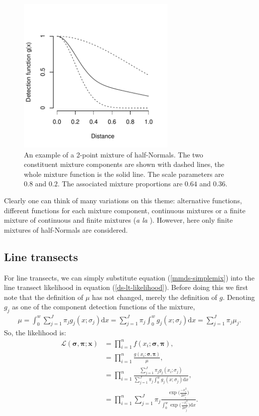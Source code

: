 \begin{figure}
\centering
\includegraphics[width=3in]{mix/figs/2ptdia.pdf}
\caption{An example of a 2-point mixture of half-Normals. The two constituent mixture components are shown with dashed lines, the whole mixture function is the solid line. The scale parameters are $0.8$ and $0.2$. The associated mixture proportions are $0.64$ and $0.36$.}
\label{2ptdia}
\end{figure}

Clearly one can think of many variations on this theme: alternative functions, different functions for each mixture component, continuous mixtures or a finite mixture of continuous and finite mixtures (\textit{a la} \cite{morgan08}). However, here only finite mixtures of half-Normals are considered.

\subsection{Line transects}
For line transects, we can simply substitute equation (\ref{mmds-simplemix}) into the line transect likelihood in equation (\ref{ds-lt-likelihood}). Before doing this we first note that the definition of $\mu$ has not changed, merely the definition of $g$. Denoting $g_j$ as one of the component detection functions of the mixture,
\begin{align*}
\mu = \int_0^w \sum_{j=1}^J \pi_j g_j(x;\sigma_j) \text{d}x = \sum_{j=1}^J \pi_j \int_0^w  g_j(x;\sigma_j) \text{d}x = \sum_{j=1}^J \pi_j \mu_j.
\end{align*}
So, the likelihood is:
\begin{align}
\mathcal{L}(\bm{\sigma}, \bm{\pi}; \bm{x}) &= \prod_{i=1}^n f(x_i;\bm{\sigma}, \bm{\pi}),\\
&= \prod_{i=1}^n \frac{g(x_i;\bm{\sigma}, \bm{\pi})}{\mu},\\
&= \prod_{i=1}^n \frac{\sum_{j=1}^J \pi_j g_j(x_i;\sigma_j)}{\sum_{j=1}^J \pi_j \int_0^w  g_j(x;\sigma_j) \text{d}x},\\
&= \prod_{i=1}^n \sum_{j=1}^J \pi_j \frac{\exp \Big( \frac{-x_i^2}{2 \sigma_j^2}\Big)}{\int_0^w \exp \Big( \frac{-x_i^2}{2 \sigma_j^2}\Big) \text{d}x}.
\label{mmds-lt-likelihood}
\end{align}


